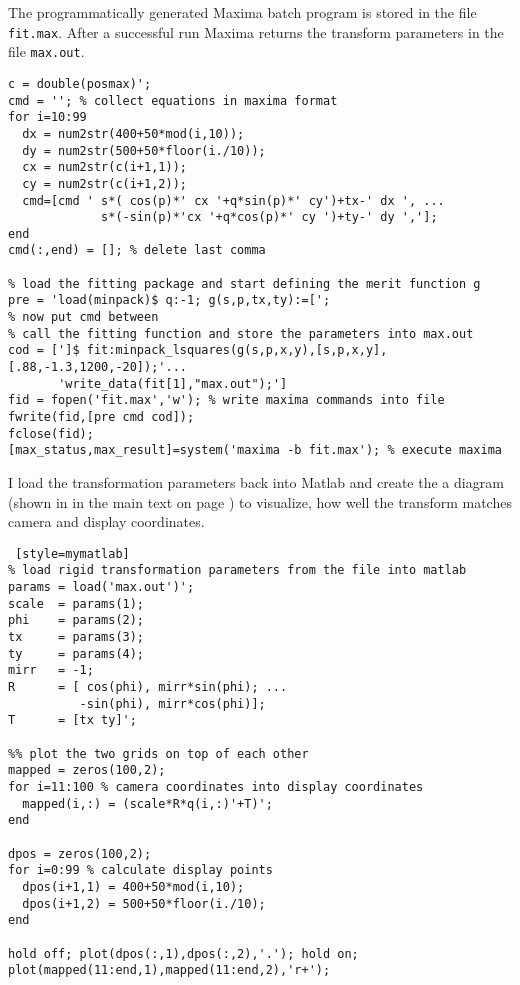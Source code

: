 The programmatically generated Maxima batch program is stored in the
file \verb!fit.max!. After a successful run Maxima returns the
transform parameters in the file \verb!max.out!.
\begin{lstlisting}[style=mymatlab]
c = double(posmax)';
cmd = ''; % collect equations in maxima format
for i=10:99 
  dx = num2str(400+50*mod(i,10));
  dy = num2str(500+50*floor(i./10));
  cx = num2str(c(i+1,1));
  cy = num2str(c(i+1,2));
  cmd=[cmd ' s*( cos(p)*' cx '+q*sin(p)*' cy')+tx-' dx ', ...
             s*(-sin(p)*'cx '+q*cos(p)*' cy ')+ty-' dy ','];
end
cmd(:,end) = []; % delete last comma

% load the fitting package and start defining the merit function g
pre = 'load(minpack)$ q:-1; g(s,p,tx,ty):=[';
% now put cmd between
% call the fitting function and store the parameters into max.out
cod = [']$ fit:minpack_lsquares(g(s,p,x,y),[s,p,x,y],[.88,-1.3,1200,-20]);'...
       'write_data(fit[1],"max.out");']
fid = fopen('fit.max','w'); % write maxima commands into file
fwrite(fid,[pre cmd cod]);
fclose(fid);
[max_status,max_result]=system('maxima -b fit.max'); % execute maxima
\end{lstlisting}
I load the transformation parameters back into Matlab and create the a
diagram (shown in  in the main text on page
\pageref{fig:rigid-compare}) to visualize, how well the transform
matches camera and display coordinates.
\begin{lstlisting} [style=mymatlab]
% load rigid transformation parameters from the file into matlab
params = load('max.out')';
scale  = params(1);
phi    = params(2);
tx     = params(3);
ty     = params(4);
mirr   = -1;
R      = [ cos(phi), mirr*sin(phi); ...
          -sin(phi), mirr*cos(phi)];
T      = [tx ty]';

%% plot the two grids on top of each other
mapped = zeros(100,2);
for i=11:100 % camera coordinates into display coordinates
  mapped(i,:) = (scale*R*q(i,:)'+T)';
end

dpos = zeros(100,2);
for i=0:99 % calculate display points
  dpos(i+1,1) = 400+50*mod(i,10);
  dpos(i+1,2) = 500+50*floor(i./10);
end

hold off; plot(dpos(:,1),dpos(:,2),'.'); hold on;
plot(mapped(11:end,1),mapped(11:end,2),'r+');
\end{lstlisting}


